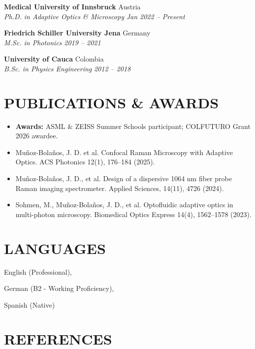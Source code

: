 \documentclass[a4paper,10pt]{article}
\newcommand{\entry}[4]{
  \textbf{#1} \hfill #2 \\
  \textit{#3} \hfill \textit{#4} \\
}
\begin{document}
\entry{Medical University of Innsbruck}{Austria}{Ph.D. in Adaptive Optics \& Microscopy}{Jan 2022 -- Present}

\vspace{4pt}

\entry{Friedrich Schiller University Jena}{Germany}{M.Sc. in Photonics}{2019 -- 2021}

\vspace{4pt}

\entry{University of Cauca}{Colombia}{B.Sc. in Physics Engineering}{2012 -- 2018}

\vspace{4pt}


\section{PUBLICATIONS \& AWARDS}
\begin{itemize}[leftmargin=*, topsep=2pt, itemsep=2pt]
    
    \item \textbf{Awards:} ASML \& ZEISS Summer Schools participant; COLFUTURO Grant 2026 awardee.
    
    \item Muñoz-Bolaños, J. D. et al. Confocal Raman Microscopy with Adaptive Optics. ACS Photonics 12(1), 176--184 (2025).
    
    \item Muñoz-Bolaños, J. D., et al. Design of a dispersive 1064 nm fiber probe Raman imaging spectrometer. Applied Sciences, 14(11), 4726 (2024).
    
    \item Sohmen, M., Muñoz-Bolaños, J. D., et al. Optofluidic adaptive optics in multi-photon microscopy. Biomedical Optics Express 14(4), 1562--1578 (2023).
    
\end{itemize}

\vspace{6pt}
\section{LANGUAGES} 

English (Professional), 

German (B2 - Working Proficiency), 

Spanish (Native)


\section{REFERENCES}
\end{document}
